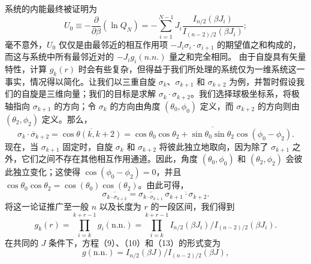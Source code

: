 系统的内能最终被证明为
\begin{equation}\tag{13.1.61}\label{eq:13.1.61}
U _ { 0 } \equiv - \frac { \partial } { \partial \beta } ( \ln Q _ { N } ) = - \sum _ { i = 1 } ^{N - 1} J _ { i } \frac { I _ { n / 2 } ( \beta J _ { i } ) } { I _ { ( n - 2 ) / 2 } ( \beta J _ { i } ) } ;
\end{equation}
毫不意外，\(U_0\) 仅仅是由最邻近的相互作用项 \(-J_i\sigma_i\cdot\sigma_{i+1}\) 的期望值之和构成的，而这与系统中所有最邻近对的 \(-J_ig_i(n.n.)\) 量之和完全相同。
由于自旋具有矢量特性，计算 \(g_{k}(r)\) 时会有些复杂，但得益于我们所处理的系统仅为一维系统这一事实，情况得以简化。让我们以三重自旋 \(\sigma_{k}\)、\(\sigma_{k+1}\) 和 \(\sigma_{k+2}\) 为例，并暂时假设我们的自旋是三维向量；我们的目标是求解 \(\overline{\sigma_{k} \cdot \sigma_{k+2}}\)。我们选择球极坐标系，将极轴指向 \(\sigma_{k+1}\) 的方向；令 \(\sigma_{k}\) 的方向由角度 \((\theta_{0}, \phi_{0})\) 定义，而 \(\sigma_{k+2}\) 的方向则由 \((\theta_{2}, \phi_{2})\) 定义。那么，
\begin{equation}\tag{13.1.62}\label{eq:13.1.62}
\overline { { \sigma _ { k } \cdot \sigma _ { k + 2 } } } = \overline { { \cos \theta ( k , k + 2 ) } } = \overline { { \cos \theta _ { 0 } \cos \theta _ { 2 } + \sin \theta _ { 0 } \sin \theta _ { 2 } \cos ( \phi _ { 0 } - \phi _ { 2 } ) } } .
\end{equation}
现在，当 \(\sigma_{k+1}\) 固定时，自旋 \(\sigma_{k}\) 和 \(\sigma_{k+2}\) 将彼此独立地取向，因为除了 \(\sigma_{k+1}\) 之外，它们之间不存在其他相互作用通道。因此，角度 \((\theta_{0},\phi_{0})\) 和 \((\theta_{2},\phi_{2})\) 会彼此独立变化；这使得 \(\cos(\phi_{0}-\phi_{2})=0\)，并且 \(\cos\theta_{0}\cos\theta_{2}=\cos(\theta_{0})\cos(\theta_{2})\)。由此可得，
\begin{equation}\tag{13.1.63}\label{eq:13.1.63}
\overline { { \sigma _ { k \cdot \sigma _ { k + 2 } } } } = \overline { { \sigma _ { k \cdot \sigma _ { k + 1 } } } } \, \overline { { \sigma _ { k + 1 } \cdot \sigma _ { k + 2 } } } .
\end{equation}
将这一论证推广至一般 \(n\) 以及长度为 \(r\) 的一段区间，我们得到
\begin{equation}\tag{13.1.64}\label{eq:13.1.64}
g _ { k } ( r ) = \prod _ { i = k } ^{k + r - 1} g _ { i } ( \mathrm { n . n . } ) = \prod _ { i = k } ^{k + r - 1} I _ { n / 2 } ( \beta J _ { i } ) / I _ { ( n - 2 ) / 2 } ( \beta J _ { i } ) .
\end{equation}
在共同的 \(J\) 条件下，方程（9）、（10）和（13）的形式变为
\begin{equation}\tag{13.1.65}\label{eq:13.1.65}
g ( \mathrm { n . n . } ) = I _ { n / 2 } ( \beta J ) / I _ { ( n - 2 ) / 2 } ( \beta J ) ,
\end{equation}
